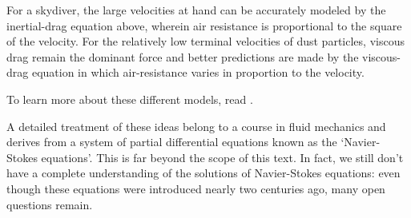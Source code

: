 \begin{center}
{\begin{minipage}{6in}
\hspace{0.125in}
For a skydiver, the large velocities at hand can be accurately modeled by the inertial-drag equation above, wherein air resistance is proportional to the square of the velocity.  For the relatively low terminal velocities of dust particles, viscous drag remain the dominant force and better predictions are made by the viscous-drag equation in which air-resistance varies in proportion to the velocity.

\hspace{0.125in}
To learn more about these different models, read \cite{velocityprimer}.

\hspace{0.125in}
A detailed treatment of these ideas belong to a course in fluid mechanics and derives from a system of partial differential equations known as the `Navier-Stokes equations'.  This is far beyond the scope of this text.  In fact, we still don't have a complete understanding of the solutions of Navier-Stokes equations: even though these equations were introduced nearly two centuries ago, many open questions remain.  


\end{minipage}
}
\end{center}

